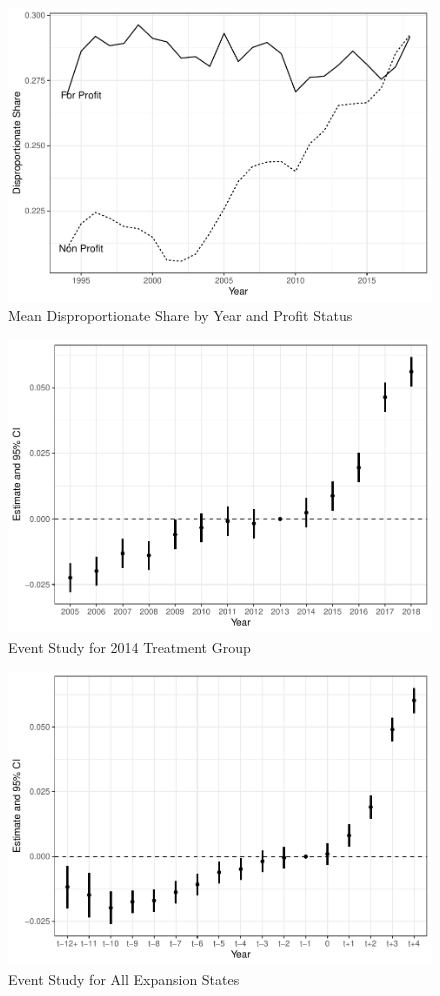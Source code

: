 \documentclass[
  12pt,
]{article}
\begin{document}
\newpage

\begin{figure}
\centering
\includegraphics{solutions_files/figure-latex/dsh-plot-1.pdf}
\caption{\label{fig:dsh-plot}Mean Disproportionate Share by Year and Profit Status}
\end{figure}

\newpage

\begin{figure}
\centering
\includegraphics{solutions_files/figure-latex/event-study1-1.pdf}
\caption{\label{fig:event-study1}Event Study for 2014 Treatment Group}
\end{figure}

\newpage

\begin{figure}
\centering
\includegraphics{solutions_files/figure-latex/event-study2-1.pdf}
\caption{\label{fig:event-study2}Event Study for All Expansion States}
\end{figure}
\end{document}
